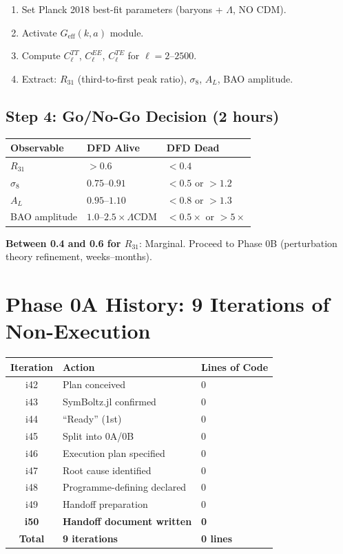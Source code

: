 \documentclass[11pt,a4paper]{article}
\begin{document}
\begin{enumerate}
\item Set Planck 2018 best-fit parameters (baryons + $\Lambda$, NO CDM).
\item Activate $G_\text{eff}(k,a)$ module.
\item Compute $C_\ell^{TT}$, $C_\ell^{EE}$, $C_\ell^{TE}$ for $\ell = 2$--$2500$.
\item Extract: $R_{31}$ (third-to-first peak ratio), $\sigma_8$, $A_L$, BAO amplitude.
\end{enumerate}

\subsection{Step 4: Go/No-Go Decision (2 hours)}

\begin{center}
\begin{tabular}{lll}
\toprule
\textbf{Observable} & \textbf{DFD Alive} & \textbf{DFD Dead} \\
\midrule
$R_{31}$ & $> 0.6$ & $< 0.4$ \\
$\sigma_8$ & $0.75$--$0.91$ & $< 0.5$ or $> 1.2$ \\
$A_L$ & $0.95$--$1.10$ & $< 0.8$ or $> 1.3$ \\
BAO amplitude & $1.0$--$2.5 \times \Lambda$CDM & $< 0.5 \times$ or $> 5 \times$ \\
\bottomrule
\end{tabular}
\end{center}

\textbf{Between 0.4 and 0.6 for $R_{31}$}: Marginal. Proceed to Phase 0B (perturbation theory refinement, weeks--months).

\section{Phase 0A History: 9 Iterations of Non-Execution}

\begin{center}
\begin{tabular}{cll}
\toprule
\textbf{Iteration} & \textbf{Action} & \textbf{Lines of Code} \\
\midrule
i42 & Plan conceived & 0 \\
i43 & SymBoltz.jl confirmed & 0 \\
i44 & ``Ready'' (1st) & 0 \\
i45 & Split into 0A/0B & 0 \\
i46 & Execution plan specified & 0 \\
i47 & Root cause identified & 0 \\
i48 & Programme-defining declared & 0 \\
i49 & Handoff preparation & 0 \\
\textbf{i50} & \textbf{Handoff document written} & \textbf{0} \\
\midrule
\textbf{Total} & \textbf{9 iterations} & \textbf{0 lines} \\
\bottomrule
\end{tabular}
\end{center}
\end{document}
